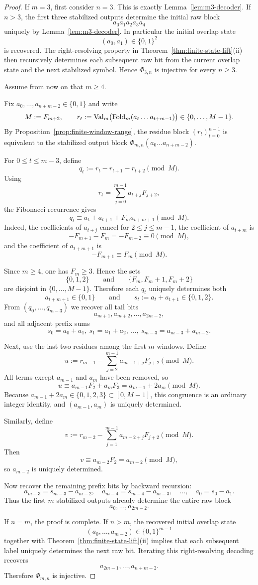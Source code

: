\begin{proof}
If $m=3$, first consider $n=3$. This is exactly Lemma~\ref{lem:m3-decoder}. If $n>3$, the first three stabilized outputs determine the initial raw block
\[
a_0a_1a_2a_3a_4
\]
uniquely by Lemma~\ref{lem:m3-decoder}. In particular the initial overlap state
\[
(a_0,a_1)\in\{0,1\}^2
\]
is recovered. The right-resolving property in Theorem~\ref{thm:finite-state-lift}(ii) then recursively determines each subsequent raw bit from the current overlap state and the next stabilized symbol. Hence $\Phi_{3,n}$ is injective for every $n\ge 3$.

Assume from now on that $m\ge 4$.

Fix $a_0,\dots,a_{n+m-2}\in\{0,1\}$ and write
\[
M:=F_{m+2},
\qquad
r_t:=\mathrm{Val}_m\bigl(\mathrm{Fold}_m(a_t\ldots a_{t+m-1})\bigr)\in\{0,\dots,M-1\}.
\]
By Proposition~\ref{prop:finite-window-range}, the residue block $(r_t)_{t=0}^{n-1}$ is equivalent to the stabilized output block $\Phi_{m,n}(a_0\ldots a_{n+m-2})$.

For $0\le t\le m-3$, define
\[
q_t:=r_t-r_{t+1}-r_{t+2}\pmod M.
\]
Using
\[
r_t=\sum_{j=0}^{m-1} a_{t+j}F_{j+2},
\]
the Fibonacci recurrence gives
\[
q_t\equiv a_t+a_{t+1}+F_m a_{t+m+1}\pmod M.
\]
Indeed, the coefficients of $a_{t+j}$ cancel for $2\le j\le m-1$, the coefficient of $a_{t+m}$ is
\[
-F_{m+1}-F_m=-F_{m+2}\equiv 0\pmod M,
\]
and the coefficient of $a_{t+m+1}$ is
\[
-F_{m+1}\equiv F_m\pmod M.
\]

Since $m\ge 4$, one has $F_m\ge 3$. Hence the sets
\[
\{0,1,2\}
\qquad\text{and}\qquad
\{F_m,F_m+1,F_m+2\}
\]
are disjoint in $\{0,\dots,M-1\}$. Therefore each $q_t$ uniquely determines both
\[
a_{t+m+1}\in\{0,1\}
\qquad\text{and}\qquad
s_t:=a_t+a_{t+1}\in\{0,1,2\}.
\]
From $(q_0,\dots,q_{m-3})$ we recover all tail bits
\[
a_{m+1},a_{m+2},\dots,a_{2m-2},
\]
and all adjacent prefix sums
\[
s_0=a_0+a_1,\ s_1=a_1+a_2,\ \dots,\ s_{m-3}=a_{m-3}+a_{m-2}.
\]

Next, use the last two residues among the first $m$ windows. Define
\[
u:=r_{m-1}-\sum_{j=2}^{m-1} a_{m-1+j}F_{j+2}\pmod M.
\]
All terms except $a_{m-1}$ and $a_m$ have been removed, so
\[
u\equiv a_{m-1}F_2+a_mF_3=a_{m-1}+2a_m\pmod M.
\]
Because $a_{m-1}+2a_m\in\{0,1,2,3\}\subset [0,M-1]$, this congruence is an ordinary integer identity, and $(a_{m-1},a_m)$ is uniquely determined.

Similarly, define
\[
v:=r_{m-2}-\sum_{j=1}^{m-1} a_{m-2+j}F_{j+2}\pmod M.
\]
Then
\[
v\equiv a_{m-2}F_2=a_{m-2}\pmod M,
\]
so $a_{m-2}$ is uniquely determined.

Now recover the remaining prefix bits by backward recursion:
\[
a_{m-3}=s_{m-3}-a_{m-2},\quad
a_{m-4}=s_{m-4}-a_{m-3},\quad \dots,\quad
a_0=s_0-a_1.
\]
Thus the first $m$ stabilized outputs already determine the entire raw block
\[
a_0,\dots,a_{2m-2}.
\]

If $n=m$, the proof is complete. If $n>m$, the recovered initial overlap state
\[
(a_0,\dots,a_{m-2})\in\{0,1\}^{m-1}
\]
together with Theorem~\ref{thm:finite-state-lift}(ii) implies that each subsequent label uniquely determines the next raw bit. Iterating this right-resolving decoding recovers
\[
a_{2m-1},\dots,a_{n+m-2}.
\]
Therefore $\Phi_{m,n}$ is injective.
\end{proof}

